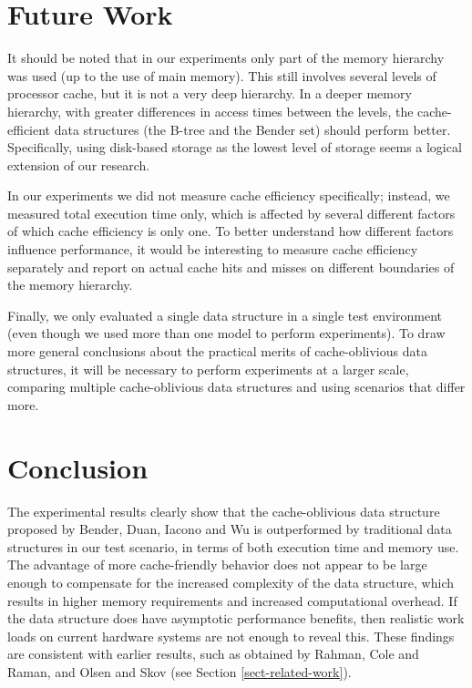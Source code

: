 \documentclass{acm_proc_article-sp}
\begin{document}
\section{Future Work}
It should be noted that in our experiments only part of the memory
hierarchy was used (up to the use of main memory). This still involves several
levels of processor cache, but it is not a very deep hierarchy. In a deeper
memory hierarchy, with greater differences in access times between the levels,
the cache-efficient data structures (the B-tree and the Bender set) should
perform better. Specifically, using disk-based storage as the lowest level of
storage seems a logical extension of our research.

In our experiments we did not measure cache efficiency specifically; instead,
we measured total execution time only, which is affected by several different
factors of which cache efficiency is only one.
To better understand how different factors influence performance, it would
be interesting to measure cache efficiency separately and report on actual
cache hits and misses on different boundaries of the memory hierarchy.

Finally, we only evaluated a single data structure in a single test
environment (even though we used more than one model to perform experiments).
To draw more general conclusions about the practical merits of cache-oblivious
data structures, it will be necessary to perform experiments at a larger scale,
comparing multiple cache-oblivious data structures and using scenarios that
differ more.

\section{Conclusion}
The experimental results clearly show that the cache-oblivious data structure
proposed by Bender, Duan, Iacono and Wu is outperformed by traditional data
structures in our test scenario, in terms of both execution time and memory use.
The advantage of more cache-friendly behavior does not appear to be large enough
to compensate for the increased complexity of the data structure, which results in
higher memory requirements and increased computational overhead.
If the data structure does have asymptotic performance benefits, then realistic
work loads on current hardware systems are not enough to reveal this.
These findings are consistent with earlier results, such as obtained by
Rahman, Cole and Raman, and Olsen and Skov (see Section \ref{sect-related-work}).
\end{document}
